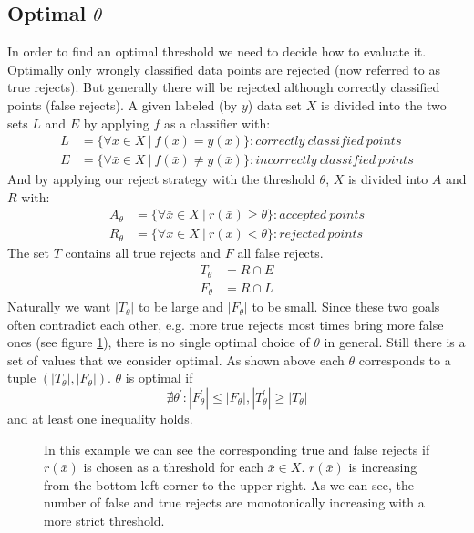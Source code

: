 \subsection{Optimal $\theta$}
\label{optimalt}
In order to find an optimal threshold we need to decide how to evaluate it. Optimally only wrongly classified data points are rejected (now referred to as true rejects). But generally there will be rejected although correctly classified points (false rejects). 
A given labeled (by $y$) data set $X$ is divided into the two sets $L$ and $E$ by applying $f$ as a classifier with:
\begin{align} 
L&=\{\forall \bar{x} \in X \ | \ f(\bar{x}) = y(\bar{x})\} : correctly \ classified \ points \\
E&=\{\forall \bar{x} \in X \ | \ f(\bar{x}) \neq y(\bar{x})\} : incorrectly \ classified \ points \end{align}
And by applying our reject strategy with the threshold $\theta$, $X$ is divided into $A$ and $R$ with:
\begin{align} 
A_\theta&=\{\forall \bar{x} \in X \ | \ r(\bar{x}) \geq \theta \} : accepted \ points \\
R_\theta&=\{\forall \bar{x} \in X \ | \ r(\bar{x}) < \theta\} : rejected \ points 
\end{align}
The set $T$ contains all true rejects and $F$ all false rejects.
\begin{align} 
T_\theta &= R \cap E \\ 
F_\theta &= R \cap L
\end{align}
Naturally we want $|T_\theta|$ to be large and $|F_\theta|$ to be small. Since these two goals often contradict each other, e.g. more true rejects most times bring more false ones (see figure \ref{incTaF}), there is no single optimal choice of $\theta$ in general. Still there is a set of values that we consider optimal. As shown above each $\theta$ corresponds to a tuple $(|T_\theta|,|F_\theta|)$. $\theta$ is optimal if
$$ \nexists \theta^{'} : |F_\theta^{'}|\leq|F_\theta|, |T_\theta^{'}|\geq|T_\theta| $$ and at least one inequality holds. 

\begin{figure}[!htbp]
\centering
\caption{In this example we can see the corresponding true and false rejects if $r(\bar{x})$ is chosen as a threshold for each $\bar{x} \in X$. $r(\bar{x})$ is increasing from the bottom left corner to the upper right. As we can see, the number of false and true rejects are monotonically increasing with a more strict threshold.}
\label{incTaF}
\end{figure}

